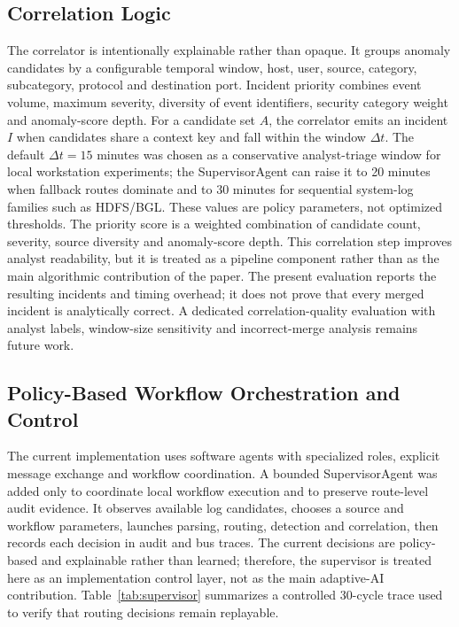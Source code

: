 \documentclass[conference]{IEEEtran}
\begin{document}
\subsection{Correlation Logic}
The correlator is intentionally explainable rather than opaque. It groups anomaly candidates by a configurable temporal window, host, user, source, category, subcategory, protocol and destination port. Incident priority combines event volume, maximum severity, diversity of event identifiers, security category weight and anomaly-score depth. For a candidate set $A$, the correlator emits an incident $I$ when candidates share a context key and fall within the window $\Delta t$. The default $\Delta t=15$ minutes was chosen as a conservative analyst-triage window for local workstation experiments; the SupervisorAgent can raise it to 20 minutes when fallback routes dominate and to 30 minutes for sequential system-log families such as HDFS/BGL. These values are policy parameters, not optimized thresholds. The priority score is a weighted combination of candidate count, severity, source diversity and anomaly-score depth. This correlation step improves analyst readability, but it is treated as a pipeline component rather than as the main algorithmic contribution of the paper. The present evaluation reports the resulting incidents and timing overhead; it does not prove that every merged incident is analytically correct. A dedicated correlation-quality evaluation with analyst labels, window-size sensitivity and incorrect-merge analysis remains future work.

\subsection{Policy-Based Workflow Orchestration and Control}
The current implementation uses software agents with specialized roles, explicit message exchange and workflow coordination. A bounded SupervisorAgent was added only to coordinate local workflow execution and to preserve route-level audit evidence. It observes available log candidates, chooses a source and workflow parameters, launches parsing, routing, detection and correlation, then records each decision in audit and bus traces. The current decisions are policy-based and explainable rather than learned; therefore, the supervisor is treated here as an implementation control layer, not as the main adaptive-AI contribution. Table~\ref{tab:supervisor} summarizes a controlled 30-cycle trace used to verify that routing decisions remain replayable.
\end{document}
